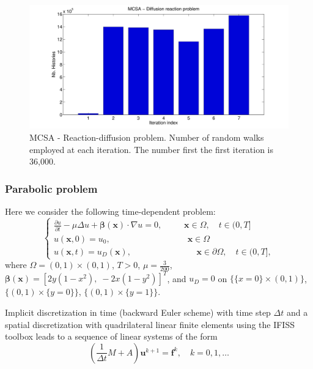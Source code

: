 \documentclass[times]{nlaauth}
\begin{document}
\begin{figure}
  \centering
    \includegraphics[width=\textwidth]{MC_graphs/MCSA_diffreac}
      \caption{MCSA - Reaction-diffusion problem. Number of random walks
employed at each
iteration. The number first the first iteration is 36,000.}
\label{MCSA_diffreac}
\end{figure}

\subsubsection{Parabolic problem}

Here we consider the
following time-dependent problem:
\begin{equation}
 \begin{cases}\frac{\partial u}{\partial t} -\mu \Delta u
+\boldsymbol{\beta}(\mathbf{x})\cdot \nabla u=0, \;\; \quad \quad
\mathbf{x}\in \Omega,\quad t\in(0,T] \\
u(\mathbf{x},0) = u_0, \qquad \qquad \qquad \qquad \quad \mathbf{x}\in
\Omega \\
u(\mathbf{x},t)=u_D(\mathbf{x}),  \; \, \, \qquad \qquad \qquad \quad
\mathbf{x}\in \partial
\Omega, \quad t\in(0,T],
 \end{cases}
\end{equation}
where $\Omega = (0,1)\times (0,1)$, $T>0$,
$\mu=\frac{3}{200}$, $\boldsymbol{\beta}(\mathbf{x})=[2y(1-x^2),\;
-2x(1-y^2)]^T$, and $u_D=0$ on $\{\{x=0\}\times (0,1)\}$, $\{(0,1)\times
\{y=0\}\}$, $\{(0,1)\times \{y=1\}\}$.\newline

Implicit discretization in time (backward Euler scheme) with time step
$\Delta t$ and
a spatial discretization with quadrilateral linear finite elements using
the IFISS toolbox \cite{ifiss} leads
to a sequence of linear systems of the form
$$ \left (\frac{1}{\Delta t} M + A\right )\mathbf{u}^{k+1} =
\mathbf{f}^k, \quad k=0,1,\ldots $$
\end{document}
